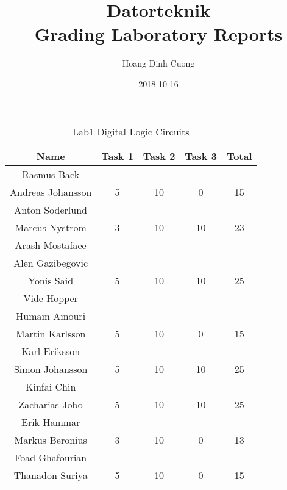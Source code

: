 \documentclass{article}
\title{Datorteknik \\ Grading Laboratory Reports}
\date{2018-10-16}
\author{Hoang Dinh Cuong}
\begin{document}
\maketitle
\newpage
{}



\begin{table}[ht]
\caption{Lab1 Digital Logic Circuits}
\centering 
\begin{tabular}{c c c c c} 
\hline\hline 
Name & Task 1 & Task 2 & Task 3 & Total \\ [0.5ex] 
\hline 
Rasmus Back \\ Andreas Johansson & 5 & 10 & 0 & 15 \\
\hline 
Anton Soderlund \\ Marcus Nystrom & 3 & 10 & 10 & 23 \\
\hline 
Arash Mostafaee \\ Alen Gazibegovic \\ Yonis Said
& 5 & 10 & 10 & 25 \\
\hline 
Vide Hopper \\ Humam Amouri \\ Martin Karlsson 
& 5 & 10 & 0 & 15 \\
\hline 
Karl Eriksson \\ Simon Johansson
& 5 & 10 & 10 & 25 \\ 
\hline
Kinfai Chin \\ Zacharias Jobo
& 5 & 10 & 10 & 25 \\ 
\hline
Erik Hammar \\ Markus Beronius
& 3 & 10 & 0 & 13 \\
\hline
Foad Ghafourian \\ Thanadon Suriya
& 5 & 10 & 0 & 15 \\ [1ex]
\hline
\end{tabular}
\label{table:nonlin}
\end{table}

\end{document}
